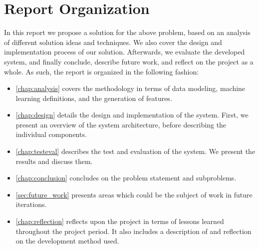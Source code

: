 \section{Report Organization}
In this report we propose a solution for the above problem, based on an analysis of different solution ideas and techniques. We also cover the design and implementation process of our solution. Afterwards, we evaluate the developed system, and finally conclude, describe future work, and reflect on the project as a whole. As such, the report is organized in the following fashion:

\begin{itemize}
	\item \cref{chap:analysis} covers the methodology in terms of data modeling, machine learning definitions, and the generation of features.
  \item \cref{chap:design} details the design and implementation of the system. First, we present an overview of the system architecture, before describing the individual components.
  \item \cref{chap:testeval} describes the test and evaluation of the system. We present the results and discuss them.
  \item \cref{chap:conclusion} concludes on the problem statement and subproblems.
  \item \cref{sec:future_work} presents areas which could be the subject of work in future iterations.
  \item \cref{chap:reflection} reflects upon the project in terms of lessons learned throughout the project period. It also includes a description of and reflection on the development method used.
\end{itemize}

